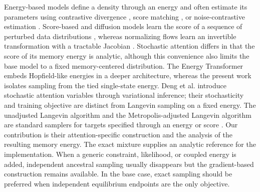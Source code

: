 Energy-based models define a density through an energy and often estimate its
parameters using contrastive divergence
\cite{hintonTrainingProductsExperts2002}, score matching
\cite{hyvarinen2005estimation}, or noise-contrastive estimation
\cite{gutmannHyvaerinenNoiseContrastive2010}. Score-based and diffusion models
learn the score of a sequence of perturbed data distributions
\cite{songGenerativeModelingEstimating2019,songScoreBasedGenerativeModeling2021,
hoDenoisingDiffusionProbabilistic2020,sohlDicksteinDeepUnsupervisedLearning2015},
whereas normalizing flows learn an invertible transformation with a tractable
Jacobian \cite{rezendeMohamed2015}. Stochastic attention differs in that the
score of its memory energy is analytic, although this convenience also limits
the base model to a fixed memory-centered distribution. The Energy Transformer
\cite{hooverEnergyTransformer2024} embeds Hopfield-like energies in a deeper
architecture, whereas the present work isolates sampling from the tied
single-state energy. Deng et al.
\cite{dengLatentAlignment2018} introduce stochastic attention variables through
variational inference; their stochasticity and training objective are distinct
from Langevin sampling on a fixed energy. The unadjusted Langevin algorithm and
the Metropolis-adjusted Langevin algorithm are standard samplers for targets
specified through an energy or score
\cite{robertsTweedieExponentialConvergence1996,durmusNonasymptoticAnalysisUnadjusted2017}.
Our contribution is their attention-specific construction and the analysis of
the resulting memory energy. The exact mixture supplies an analytic reference
for the implementation. When a generic constraint, likelihood, or coupled
energy is added, independent ancestral sampling usually disappears but the
gradient-based construction remains available. In the base case, exact
sampling should be preferred when independent equilibrium endpoints are the
only objective.

